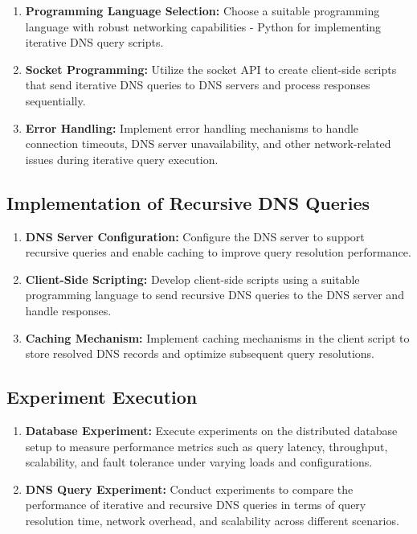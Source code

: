 \documentclass[11pt]{article}
\begin{document}
\begin{enumerate}
\item \textbf{Programming Language Selection:} Choose a suitable programming language with robust networking capabilities - Python for implementing iterative DNS query scripts.
\item \textbf{Socket Programming:} Utilize the socket API to create client-side scripts that send iterative DNS queries to DNS servers and process responses sequentially.
\item \textbf{Error Handling:} Implement error handling mechanisms to handle connection timeouts, DNS server unavailability, and other network-related issues during iterative query execution.
\end{enumerate}

\subsection{Implementation of Recursive DNS Queries}

\begin{enumerate}
\item \textbf{DNS Server Configuration:} Configure the DNS server to support recursive queries and enable caching to improve query resolution performance.
\item \textbf{Client-Side Scripting:} Develop client-side scripts using a suitable programming language to send recursive DNS queries to the DNS server and handle responses.
\item \textbf{Caching Mechanism:} Implement caching mechanisms in the client script to store resolved DNS records and optimize subsequent query resolutions.
\end{enumerate}

\subsection{Experiment Execution}

\begin{enumerate}
\item \textbf{Database Experiment:} Execute experiments on the distributed database setup to measure performance metrics such as query latency, throughput, scalability, and fault tolerance under varying loads and configurations.
\item \textbf{DNS Query Experiment:} Conduct experiments to compare the performance of iterative and recursive DNS queries in terms of query resolution time, network overhead, and scalability across different scenarios.
\end{enumerate}
\end{document}
